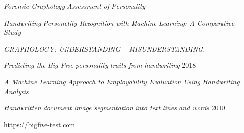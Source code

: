 \documentclass[10pt, a4paper]{article}
\begin{document}
\begin{thebibliography}{99}
         \emph{Forensic Graphology Assessment of Personality}

         \emph{Handwriting Personality Recognition with Machine  Learning: A Comparative Study}

         \emph{GRAPHOLOGY: UNDERSTANDING – MISUNDERSTANDING.}

         \emph{Predicting the Big Five personality traits from handwriting } 2018

         \emph{A Machine Learning Approach to Employability Evaluation Using Handwriting Analysis}

         \emph{Handwritten document image segmentation into text lines and words} 2010
        
         \url{https://bigfive-test.com}
    \end{thebibliography}
\end{document}
